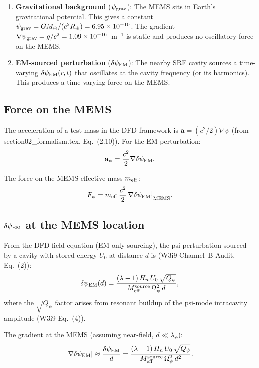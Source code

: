 \documentclass[11pt]{article}
\newcommand{\lam}{\lambda}
\newcommand{\Opsi}{\Omega_\psi}
\newcommand{\Meff}{M_{\rm eff}}
\newcommand{\ee}[1]{\times 10^{#1}}
\newcommand{\Qpsi}{Q_\psi}
\newcommand{\Heff}{H_n}
\newcommand{\psigrav}{\psi_{\rm grav}}
\newcommand{\dpsiEM}{\delta\psi_{\rm EM}}
\theoremstyle{definition}
\theoremstyle{remark}
\begin{document}
\begin{enumerate}
\item \textbf{Gravitational background} ($\psigrav$): The MEMS sits
  in Earth's gravitational potential. This gives a constant
  $\psigrav = GM_\oplus/(c^2 R_\oplus) = 6.95\ee{-10}$. The
  gradient $\nabla\psigrav = g/c^2 = 1.09\ee{-16}$~m$^{-1}$ is
  static and produces no oscillatory force on the MEMS.

\item \textbf{EM-sourced perturbation} ($\dpsiEM$): The nearby SRF
  cavity sources a time-varying $\dpsiEM(r,t)$ that oscillates at
  the cavity frequency (or its harmonics). This produces a
  time-varying force on the MEMS.
\end{enumerate}

\subsection{Force on the MEMS}

The acceleration of a test mass in the DFD framework is
$\mathbf{a} = (c^2/2)\nabla\psi$ (from section02\_formalism.tex,
Eq.~(2.10)). For the EM perturbation:
\begin{equation}
\mathbf{a}_\psi = \frac{c^2}{2}\nabla\dpsiEM.
\label{eq:a_psi}
\end{equation}

The force on the MEMS effective mass $m_{\rm eff}$:
\begin{equation}
F_\psi = m_{\rm eff}\,\frac{c^2}{2}\,\nabla\dpsiEM\big|_{\rm MEMS}.
\label{eq:F_psi}
\end{equation}

\subsection{$\dpsiEM$ at the MEMS location}

From the DFD field equation (EM-only sourcing), the psi-perturbation
sourced by a cavity with stored energy $U_0$ at distance $d$ is
(W3i9 Channel~B Audit, Eq.~(2)):
\begin{equation}
\dpsiEM(d) = \frac{(\lam-1)\,\Heff\,U_0\,\sqrt{\Qpsi}}
{\Meff^{\rm source}\,\Opsi^2\,d},
\label{eq:dpsi_at_MEMS}
\end{equation}
where the $\sqrt{\Qpsi}$ factor arises from resonant buildup
of the psi-mode intracavity amplitude (W3i9 Eq.~(4)).

The gradient at the MEMS (assuming near-field, $d \ll \lambda_\psi$):
\begin{equation}
|\nabla\dpsiEM| \approx \frac{\dpsiEM}{d}
= \frac{(\lam-1)\,\Heff\,U_0\,\sqrt{\Qpsi}}
{\Meff^{\rm source}\,\Opsi^2\,d^2}.
\label{eq:grad_dpsi}
\end{equation}
\end{document}
